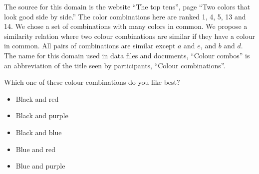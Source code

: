 The source for this domain is the website ``The top tens'', page ``Two colors that look good side by side.''
The color combinations here are ranked 1, 4, 5, 13 and 14.
We chose a set of combinations with many colors in common.
We propose a similarity relation where two colour combinations are similar if they have a colour in common.
All pairs of combinations are similar except $a$ and $e$, and $b$ and $d$.
The name for this domain used in data files and documents, ``Colour combos'' is an abbreviation of the title seen by participants, ``Colour combinations''.

\begin{tcolorbox}
Which one of these colour combinations do you like best?

\begin{itemize}
	\item Black and red
	\item Black and purple
	\item Black and blue
	\item Blue and red
	\item Blue and purple
\end{itemize}
\end{tcolorbox}
